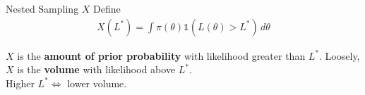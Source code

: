 \begin{frame}{Nested Sampling $X$}
\vspace{-20pt}
Define
\begin{eqnarray*}
X(L^*) = \int \pi(\theta) \mathds{1}\left(L(\theta) > L^*\right)\, d\theta
\end{eqnarray*}

\vspace{10pt}

$X$ is the {\bf amount of prior probability} with likelihood greater than $L^*$.
Loosely, $X$ is the {\bf volume} with likelihood above $L^*$.\\
Higher $L^* \Leftrightarrow$ lower volume.
\end{frame}
